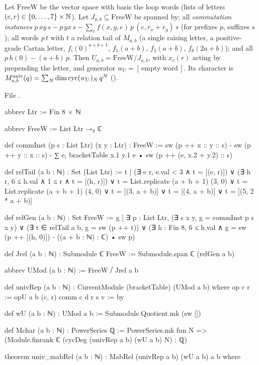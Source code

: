 \begin{definition}\label{l26:def:umod}
Let $\mathrm{FreeW}$ be the vector space with basis the loop words (lists of letters $(c,r)\in\{0,\dots,7\}\times{\mathbb{N}}$).
Let $J_{a,b}\subseteq\mathrm{FreeW}$ be spanned by: all \emph{commutation instances}
$p\,xy\,s-p\,yx\,s-\sum_ef(x,y,e)\,p\,(e,r_x+r_y)\,s$ (for prefixes $p$, suffixes $s$); all words $p\,t$ with $t$ a
relation tail of $M_{a,b}$ (a single raising letter, a positive-grade Cartan letter, $f_i(0)^{a+b+1}$, $f_1(a+b)$,
$f_2(a+b)$, $f_\theta(2a+b)$); and all $p\,h(0)-(a+b)\,p$. Then $U_{a,b}=\mathrm{FreeW}/J_{a,b}$, with $x_c(r)$
acting by prepending the letter, and generator $w_U=[\,\text{empty word}\,]$. Its character is
$M_{a,b}^{\mathrm{univ}}(q)=\sum_N\dim\operatorname{cyc}(w_U)_N\,q^N$ ().
\end{definition}
\noindent File .
\begin{leancode}
abbrev Ltr := Fin 8 × ℕ

abbrev FreeW := List Ltr →₀ ℂ

def commInst (p s : List Ltr) (x y : Ltr) : FreeW :=
  sw (p ++ x :: y :: s) - sw (p ++ y :: x :: s) -
    ∑ e, bracketTable x.1 y.1 e • sw (p ++ (e, x.2 + y.2) :: s)

def relTail (a b : ℕ) : Set (List Ltr) :=
  {t | (∃ e r, e.val < 3 ∧ t = [(e, r)]) ∨ (∃ h r, 6 ≤ h.val ∧ 1 ≤ r ∧ t = [(h, r)]) ∨
    t = List.replicate (a + b + 1) (3, 0) ∨ t = List.replicate (a + b + 1) (4, 0) ∨
    t = [(3, a + b)] ∨ t = [(4, a + b)] ∨ t = [(5, 2 * a + b)]}

def relGen (a b : ℕ) : Set FreeW :=
  {g | ∃ p : List Ltr, (∃ s x y, g = commInst p s x y) ∨ (∃ t ∈ relTail a b, g = sw (p ++ t)) ∨
    (∃ h : Fin 8, 6 ≤ h.val ∧ g = sw (p ++ [(h, 0)]) - ((a + b : ℕ) : ℂ) • sw p)}

def Jrel (a b : ℕ) : Submodule ℂ FreeW := Submodule.span ℂ (relGen a b)

abbrev UMod (a b : ℕ) := FreeW ⧸ Jrel a b

def univRep (a b : ℕ) : CurrentModule (bracketTable) (UMod a b) where
  op c r := opU a b (c, r)
  comm c d r s v := by

def wU (a b : ℕ) : UMod a b := Submodule.Quotient.mk (sw [])

def Mchar (a b : ℕ) : PowerSeries ℚ :=
  PowerSeries.mk fun N => (Module.finrank ℂ (cycDeg (univRep a b) (wU a b) N) : ℚ)
\end{leancode}
\begin{leancode}
theorem univ_mabRel (a b : ℕ) : MabRel (univRep a b) (wU a b) a b where
\end{leancode}

